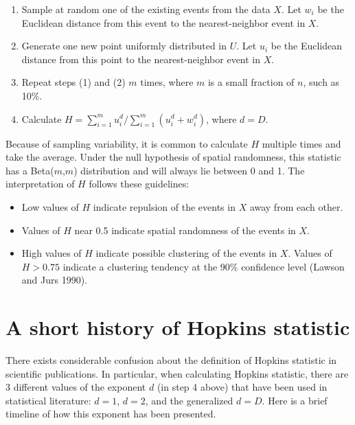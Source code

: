 \begin{enumerate}
\def\labelenumi{\arabic{enumi}.}
\tightlist
\item
  Sample at random one of the existing events from the data \(X\). Let \(w_i\) be the Euclidean distance from this event to the nearest-neighbor event in \(X\).
\item
  Generate one new point uniformly distributed in \(U\). Let \(u_i\) be the Euclidean distance from this point to the nearest-neighbor event in \(X\).
\item
  Repeat steps (1) and (2) \(m\) times, where \(m\) is a small fraction of \(n\), such as 10\%.
\item
  Calculate \(H = \sum_{i=1}^m u_i^d \big/ \sum_{i=1}^m (u_i^d + w_i^d)\), where \(d=D\).
\end{enumerate}

Because of sampling variability, it is common to calculate \(H\) multiple times and take the average. Under the null hypothesis of spatial randomness, this statistic has a Beta(\(m\),\(m\)) distribution and will always lie between 0 and 1. The interpretation of \(H\) follows these guidelines:

\begin{itemize}
\tightlist
\item
  Low values of \(H\) indicate repulsion of the events in \(X\) away from each other.
\item
  Values of \(H\) near 0.5 indicate spatial randomness of the events in \(X\).
\item
  High values of \(H\) indicate possible clustering of the events in \(X\). Values of \(H > 0.75\) indicate a clustering tendency at the 90\% confidence level (Lawson and Jurs 1990).
\end{itemize}

\hypertarget{a-short-history-of-hopkins-statistic}{%
\section{A short history of Hopkins statistic}\label{a-short-history-of-hopkins-statistic}}

There exists considerable confusion about the definition of Hopkins statistic in scientific publications. In particular, when calculating Hopkins statistic, there are 3 different values of the exponent \(d\) (in step 4 above) that have been used in statistical literature: \(d=1\), \(d=2\), and the generalized \(d=D\). Here is a brief timeline of how this exponent has been presented.

